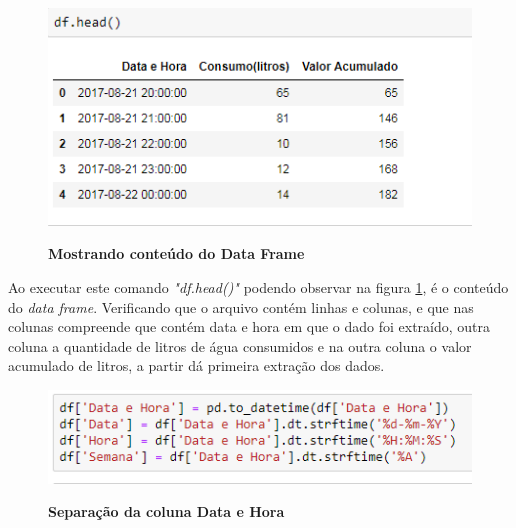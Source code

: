 \begin{figure}[ht]
	\caption{\textbf{Mostrando conteúdo do Data Frame}}
	\centering
		\includegraphics[scale=1, keepaspectratio]{figuras/mostraroconteudodoarquivo}
		\label{conteudo_df}
\end{figure}

\par Ao executar este comando \emph{"df.head()"} podendo observar na figura \ref{conteudo_df}, é o conteúdo do \emph{data frame}. Verificando que o arquivo contém linhas e colunas, e que nas colunas compreende que contém data e hora em que o dado foi extraído, outra coluna a quantidade de litros de água consumidos e na outra coluna o valor acumulado de litros, a partir dá primeira extração dos dados. 

\begin{figure}[ht]
	\caption{\textbf{Separação da coluna Data e Hora}}
	\centering
		\includegraphics[scale=1, keepaspectratio]{figuras/organizararquivopordata}
		\label{separar_horaedata}
\end{figure}

